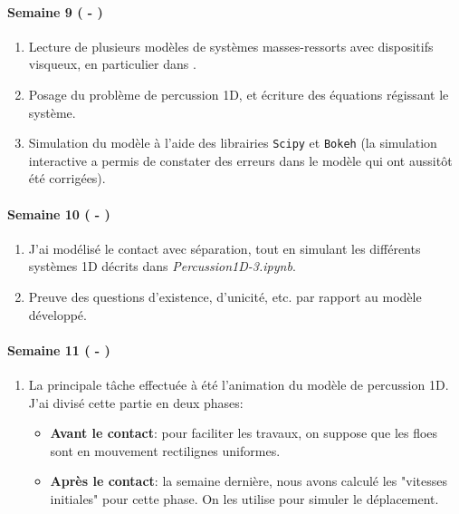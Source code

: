 \paragraph{Semaine 9 ( - )} 
\begin{enumerate}
    \item Lecture de plusieurs modèles de systèmes masses-ressorts avec dispositifs visqueux, en particulier dans \parencite{homodeling}.
    \item Posage du problème de percussion 1D, et écriture des équations régissant le système.
    \item Simulation du modèle à l'aide des librairies \verb|Scipy| et \verb|Bokeh| (la simulation interactive a permis de constater des erreurs dans le modèle qui ont aussitôt été corrigées). 
\end{enumerate}
  

\paragraph{Semaine 10 ( - )} 
\begin{enumerate}
    \item J'ai modélisé le contact avec séparation, tout en simulant les différents systèmes 1D décrits dans \emph{Percussion1D-3.ipynb}. 
    \item Preuve des questions d'existence, d'unicité, etc. par rapport au modèle développé.
\end{enumerate}


\paragraph{Semaine 11 ( - )} 
\begin{enumerate}
    \item La principale tâche effectuée à été l'animation du modèle de percussion 1D. J'ai divisé cette partie en deux phases:
    \begin{itemize}
        \item \textbf{Avant le contact}: pour faciliter les travaux, on suppose que les floes sont en mouvement rectilignes uniformes.
        \item \textbf{Après le contact}: la semaine dernière, nous avons calculé les "vitesses initiales" pour cette phase. On les utilise pour simuler le déplacement.
    \end{itemize}
\end{enumerate}


